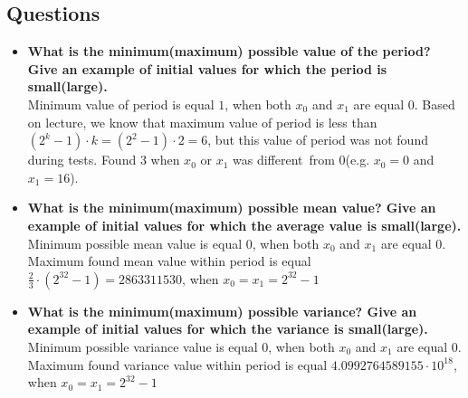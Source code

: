 \documentclass[a4paper,10pt]{article}
\begin{document}
\subsection{Questions}
\begin{itemize}
 \item \textbf{What is the minimum(maximum) possible value of the period? Give an example of initial values for which the period is small(large).} \\
Minimum value of period is equal $1$, when both $x_0$ and $x_1$ are equal $0$. Based on lecture, we know that maximum value of period is less than
$( 2^k - 1 ) \cdot k = ( 2^2 - 1) \cdot 2 = 6$, but this value of period was not found during tests. Found $3$ when $x_0$ or $x_1$ was different from 0(e.g. $x_0 = 0$ and $x_1 = 16$).

 \item \textbf{What is the minimum(maximum) possible mean value? Give an example of initial values for which the average value is small(large).} \\
Minimum possible mean value is equal $0$, when both $x_0$ and $x_1$ are equal $0$. Maximum found mean value within period is equal $\frac{2}{3} \cdot (2^{32} - 1) = 2863311530$, when $x_0 = x_1 = 2^{32} -1$

 \item \textbf{What is the minimum(maximum) possible variance? Give an example of initial values for which the variance is small(large).} \\
Minimum possible variance value is equal $0$, when both $x_0$ and $x_1$ are equal $0$. Maximum found variance value within period is equal $4.0992764589155 \cdot 10^{18}$, when $x_0 = x_1 = 2^{32} -1$


\end{itemize}
\end{document}
